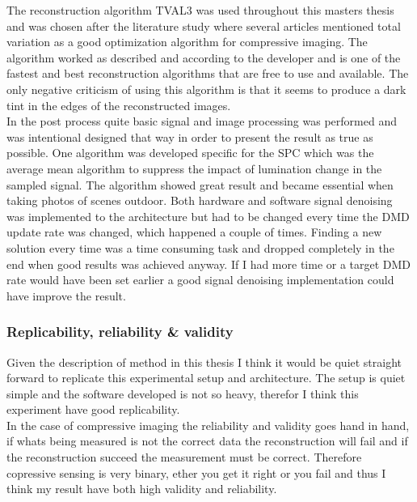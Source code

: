 The reconstruction algorithm TVAL3 was used throughout this masters thesis and was chosen after the literature study where several articles mentioned total variation as a good optimization algorithm for compressive imaging. The algorithm worked as described and according to the developer and is one of the fastest and best reconstruction algorithms that are free to use and available. The only negative criticism of using this algorithm is that it seems to produce a dark tint in the edges of the reconstructed images.\\[0.1in]

In the post process quite basic signal and image processing was performed and was intentional designed that way in order to present the result as true as possible. One algorithm was developed specific for the SPC which was the average mean algorithm to suppress the impact of lumination change in the sampled signal. The algorithm showed great result and became essential when taking photos of scenes outdoor. Both hardware and software signal denoising was implemented to the architecture but had to be changed every time the DMD update rate was changed, which happened a couple of times. Finding a new solution every time was a time consuming task and dropped completely in the end when good results was achieved anyway. If I had more time or a target DMD rate would have been set earlier a good signal denoising implementation could have improve the result.\\[0.1in]

\subsubsection{Replicability, reliability \& validity}
Given the description of method in this thesis I think it would be quiet straight forward to replicate this experimental setup and architecture. The setup is quiet simple and the software developed is not so heavy, therefor I think this experiment have good replicability.\\[0.1in]

In the case of compressive imaging the reliability and validity goes hand in hand, if whats being measured is not the correct data the reconstruction will fail and if the reconstruction succeed the measurement must be correct. Therefore copressive sensing is very binary, ether you get it right or you fail and thus I think my result have both high validity and reliability.  

 


